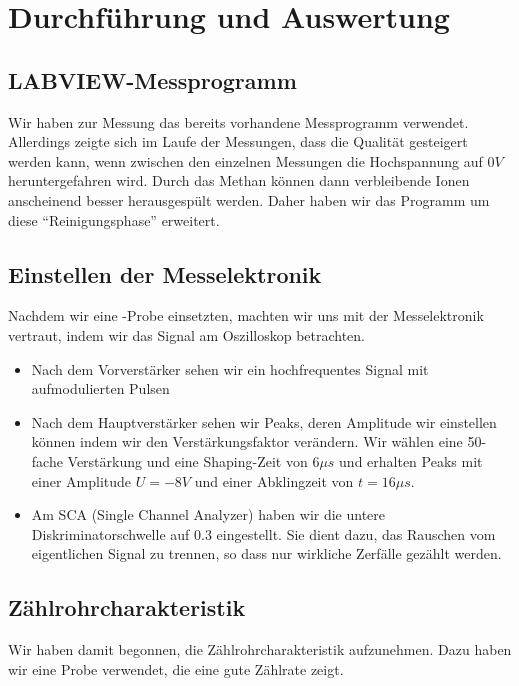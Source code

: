 \section{Durchführung und Auswertung}

\subsection{LABVIEW-Messprogramm}

Wir haben zur Messung das bereits vorhandene Messprogramm verwendet. Allerdings zeigte sich im Laufe der Messungen, dass die Qualität gesteigert werden kann, wenn zwischen den einzelnen Messungen die Hochspannung auf $0V$ heruntergefahren wird. Durch das Methan können dann verbleibende Ionen anscheinend besser herausgespült werden. Daher haben wir das Programm um diese "`Reinigungsphase"' erweitert.

\subsection{Einstellen der Messelektronik}
Nachdem wir eine -Probe einsetzten, machten wir uns mit der Messelektronik vertraut, indem wir das Signal am Oszilloskop betrachten.
\begin{itemize}
 \item Nach dem Vorverstärker sehen wir ein hochfrequentes Signal mit aufmodulierten Pulsen
 \item Nach dem Hauptverstärker sehen wir Peaks, deren Amplitude wir einstellen können indem wir den Verstärkungsfaktor verändern. Wir wählen eine 50-fache Verstärkung und eine Shaping-Zeit von $6\mu s$ und erhalten Peaks mit einer Amplitude $U = -8V$ und einer Abklingzeit von $t = 16\mu s$.
 \item Am SCA (Single Channel Analyzer) haben wir die untere Diskriminatorschwelle auf $0.3$ eingestellt. Sie dient dazu, das Rauschen vom eigentlichen Signal zu trennen, so dass nur wirkliche Zerfälle gezählt werden. 
\end{itemize}

\subsection{Zählrohrcharakteristik}

Wir haben damit begonnen, die Zählrohrcharakteristik aufzunehmen. Dazu haben wir eine  Probe verwendet, die eine gute Zählrate zeigt.

